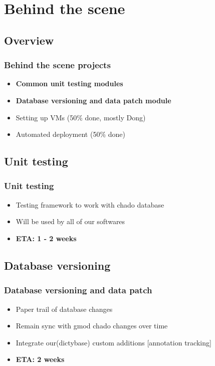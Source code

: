 \documentclass[hyperref={pdfpagelabels=false}, compress]{beamer}
\begin{document}
\section{Behind the scene}
\subsection{Overview}
\begin{frame}
  \frametitle{Behind the scene projects}
  \begin{itemize}
       \item  \textbf{Common unit testing modules}
        \item \textbf{Database versioning and data patch module}
         \item Setting up VMs (50\% done, mostly Dong)
         \item Automated deployment (50\% done)
  \end{itemize}
\end{frame}

\subsection{Unit testing}
\begin{frame}
  \frametitle{Unit testing}
  \begin{itemize}
      \item Testing framework to work with chado database
      \item Will be used by all of our softwares
      \item \textbf{ETA: 1 - 2 weeks}
  \end{itemize}
\end{frame}

\subsection{Database versioning}
\begin{frame}
  \frametitle{Database versioning and data patch}
  \begin{itemize}
      \item Paper trail of database changes
      \item Remain sync with gmod chado changes over time
      \item Integrate our(dictybase) custom additions [annotation tracking]
      \item \textbf{ETA: 2 weeks}
  \end{itemize}
\end{frame}
\end{document}

